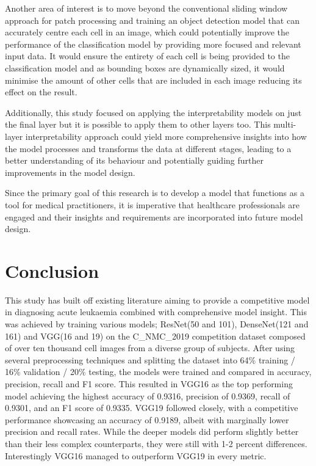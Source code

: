 \documentclass[
	a4paper,
	10pt,
	unnumberedsections,
	twoside,
]{research_article}
\begin{document}
Another area of interest is to move beyond the conventional sliding window approach for patch processing and training an object detection model that can accurately centre each cell in an image, which could potentially improve the performance of the classification model by providing more focused and relevant input data. It would ensure the entirety of each cell is being provided to the classification model and as bounding boxes are dynamically sized, it would minimise the amount of other cells that are included in each image reducing its effect on the result.

Additionally, this study focused on applying the interpretability models on just the final layer but it is possible to apply them to other layers too. This multi-layer interpretability approach could yield more comprehensive insights into how the model processes  and transforms the data at different stages, leading to a better understanding of its behaviour and potentially guiding further improvements in the model design.

Since the primary goal of this research is to develop a model that functions as a tool for medical practitioners, it is imperative that healthcare professionals are engaged and their insights and requirements are incorporated into future model design.

\newpage
\section{Conclusion}
\vspace{-1mm}
This study has built off existing literature aiming to provide a competitive model in diagnosing acute leukaemia combined with comprehensive model insight. This was achieved by training various models; ResNet(50 and 101), DenseNet(121 and 161) and VGG(16 and 19) on the C\_NMC\_2019 competition dataset composed of over ten thousand cell images from a diverse group of subjects. After using several preprocessing techniques and splitting the dataset into 64\% training / 16\% validation / 20\% testing, the models were trained and compared in accuracy, precision, recall and F1 score. This resulted in VGG16 as the top performing model achieving the highest accuracy of 0.9316, precision of 0.9369, recall of 0.9301, and an F1 score of 0.9335. VGG19 followed closely, with a competitive performance showcasing an accuracy of 0.9189, albeit with marginally lower precision and recall rates. While the deeper models did perform slightly better than their less complex counterparts, they were still with 1-2 percent differences. Interestingly VGG16 managed to outperform VGG19 in every metric.
\end{document}
